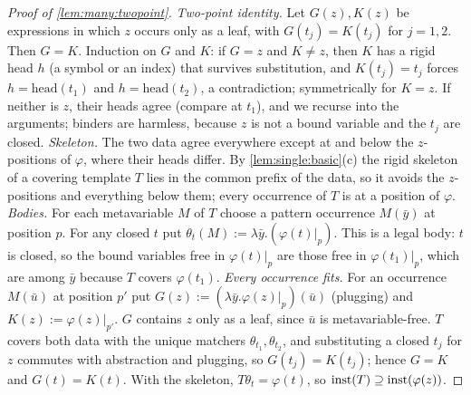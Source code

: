\begin{proof}[Proof of \cref{lem:many:twopoint}]
\emph{Two-point identity.} Let $G(z),K(z)$ be expressions in which $z$ occurs only as a leaf, with $G(t_j)=K(t_j)$ for
$j=1,2$. Then $G=K$. Induction on $G$ and $K$: if $G=z$ and $K\neq z$, then $K$ has a rigid head $h$ (a symbol or an
index) that survives substitution, and $K(t_j)=t_j$ forces $h=\mathrm{head}(t_1)$ and $h=\mathrm{head}(t_2)$, a
contradiction; symmetrically for $K=z$. If neither is $z$, their heads agree (compare at $t_1$), and we recurse into the
arguments; binders are harmless, because $z$ is not a bound variable and the $t_j$ are closed.
\emph{Skeleton.} The two data agree everywhere except at and below the $z$-positions of $\varphi$, where their heads
differ. By \cref{lem:single:basic}(c) the rigid skeleton of a covering template $T$ lies in the common
prefix of the data, so it avoids the $z$-positions and everything below them; every occurrence of $T$ is at a position of
$\varphi$.
\emph{Bodies.} For each metavariable $M$ of $T$ choose a pattern occurrence $M(\bar y)$ at position $p$. For any closed
$t$ put $\theta_t(M):=\lambda\bar y.(\varphi(t)|_p)$. This is a legal body: $t$ is closed, so the bound variables free in
$\varphi(t)|_p$ are those free in $\varphi(t_1)|_p$, which are among $\bar y$ because $T$ covers $\varphi(t_1)$.
\emph{Every occurrence fits.} For an occurrence $M(\bar u)$ at position $p'$ put $G(z):=(\lambda\bar y.\varphi(z)|_p)(\bar u)$
(plugging) and $K(z):=\varphi(z)|_{p'}$. $G$ contains $z$ only as a leaf, since $\bar u$ is metavariable-free. $T$ covers
both data with the unique matchers $\theta_{t_1},\theta_{t_2}$, and substituting a closed $t_j$ for $z$ commutes with
abstraction and plugging, so $G(t_j)=K(t_j)$; hence $G=K$ and $G(t)=K(t)$. With the skeleton, $T\theta_t=\varphi(t)$, so
$\mathrm{inst}(T)\supseteq\mathrm{inst}(\varphi(z))$.
\end{proof}

